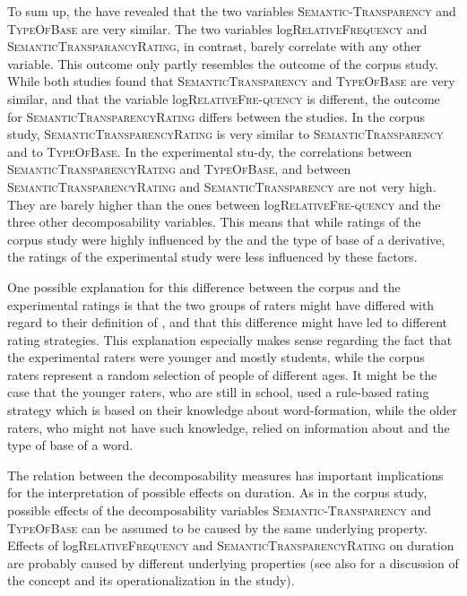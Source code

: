  
 To sum up, the  have revealed that the two variables \textsc{Semantic-Transparency} and \textsc{TypeOfBase} are very similar. The two variables log\textsc{Rela\-tiveFrequency} and \textsc{SemanticTransparancyRating}, in contrast, barely correlate with any other  variable.
This outcome only partly resembles the outcome of the corpus study. While both studies found that \textsc{SemanticTransparency} and \textsc{TypeOfBase} are very similar, and that the variable log\textsc{RelativeFre-quency} is different, the outcome for \textsc{SemanticTransparencyRating} differs between the studies. 
In the corpus study, \textsc{SemanticTransparencyRating} is very similar to \textsc{SemanticTransparency} and to \textsc{TypeOfBase}. In the experimental stu-dy, the correlations between \textsc{SemanticTransparencyRating} and \textsc{TypeOfBase}, and between \textsc{SemanticTransparencyRating}  and \textsc{SemanticTransparency} are not very high. They are barely higher than the ones between log\textsc{RelativeFre-quency} and the three other decomposability variables. 
This means that while ratings of the corpus study were highly influenced by the  and the type of base of a derivative, the ratings of the experimental study were less influenced by these factors.

 
 One possible explanation for this difference between the corpus and the experimental ratings is that the two groups of raters might have differed with regard to their definition of , and that this difference might have led to different rating strategies. This explanation especially makes sense regarding the fact that the experimental raters were younger and mostly students, while the corpus raters represent a random selection of people of different ages. It might be the case that the younger raters, who are still in school, used a rule-based rating strategy which is based on their knowledge about word-formation, while the older raters, who might not have such knowledge, relied on information about  and the type of base of a word. 

 The relation between the decomposability measures has important implications for the interpretation of possible  effects on duration. As in the corpus study, possible effects of the decomposability variables \textsc{Semantic-Transparency} and \textsc{TypeOfBase} can be assumed to be caused by the same underlying property. 
 Effects of log\textsc{RelativeFrequency} and \textsc{SemanticTransparencyRating} on duration are probably caused by different underlying properties (see also  for a discussion of the concept  and its operationalization in the study).
 
